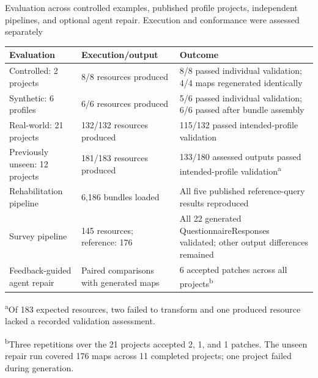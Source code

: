 \documentclass[border=2pt]{standalone}
\begin{document}
\begin{minipage}{190mm}
\fontsize{10}{12}\selectfont
\setlength{\parindent}{0pt}
Evaluation across controlled examples, published profile projects, independent
pipelines, and optional agent repair. Execution and conformance were assessed
separately\par
\smallskip
\setlength{\tabcolsep}{3mm}
\renewcommand{\arraystretch}{1.08}
\begin{tabular}{@{}p{43mm}p{41mm}p{94mm}@{}}
\toprule
Evaluation & Execution/output & Outcome \\
\midrule
Controlled: 2 projects &
8/8 resources produced &
8/8 passed individual validation; 4/4 maps regenerated identically \\
\addlinespace
Synthetic: 6 profiles &
6/6 resources produced &
5/6 passed individual validation; 6/6 passed after bundle assembly \\
\addlinespace
Real-world: 21 projects &
132/132 resources produced &
115/132 passed intended-profile validation \\
\addlinespace
Previously unseen: 12 projects &
181/183 resources produced &
133/180 assessed outputs passed intended-profile validation\textsuperscript{a} \\
\addlinespace
Rehabilitation pipeline &
6,186 bundles loaded &
All five published reference-query results reproduced \\
\addlinespace
Survey pipeline &
145 resources; reference: 176 &
All 22 generated QuestionnaireResponses validated; other output differences remained \\
\addlinespace
Feedback-guided agent repair &
Paired comparisons with generated maps &
6 accepted patches across all projects\textsuperscript{b} \\
\bottomrule
\end{tabular}\par
\medskip
{\fontsize{9}{11}\selectfont\centering
\textsuperscript{a}Of 183 expected resources, two failed to transform and one
produced resource lacked a recorded validation assessment.\par
\textsuperscript{b}Three repetitions over the 21 projects accepted 2, 1, and 1
patches. The unseen repair run covered 176 maps across 11 completed projects;
one project failed during generation.\par}
\end{minipage}
\end{document}
